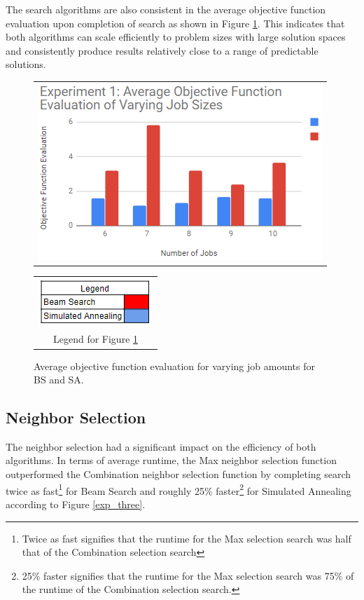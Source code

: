 \documentclass[10pt, twocolumn]{article}
\begin{document}
The search algorithms are also consistent in the average objective function evaluation upon completion of search as shown in Figure \ref{exp_one_obj}. This indicates that both algorithms can scale efficiently to problem sizes with large solution spaces and consistently produce results relatively close to a range of predictable solutions.

\begin{figure}[!h]
    \centering
    \begin{tabular}[b]{c}
        \includegraphics[width=.90\linewidth]{exp_one_obj.png} \\
    \end{tabular} \qquad
     \begin{tabular}[b]{c}
        \includegraphics[width=.3\linewidth]{legend.png} \\
        \small Legend for Figure \ref{exp_one_obj}
    \end{tabular}
    \caption{Average objective function evaluation for varying job amounts for BS and SA.}  \label{exp_one_obj}
\end{figure}


\subsection{Neighbor Selection}

The neighbor selection had a significant impact on the efficiency of both algorithms. In terms of average runtime, the Max neighbor selection function outperformed the Combination neighbor selection function by completing search twice as fast\footnote{Twice as fast signifies that the runtime for the Max selection search was half that of the Combination selection search} for Beam Search
and roughly 25\% faster\footnote{25\% faster signifies that the runtime for the Max selection search was 75\% of the runtime of the Combination selection search.} for Simulated Annealing according to Figure \ref{exp_three}.
\end{document}
